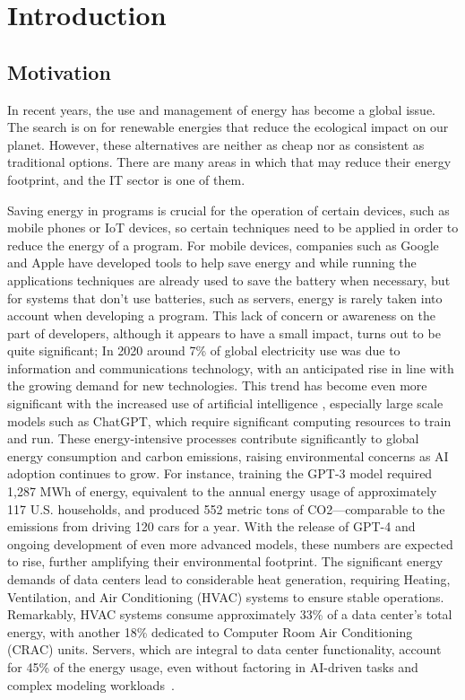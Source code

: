 \chapter{Introduction}

\section{Motivation}

In recent years, the use and management of energy has become a global issue. The search is on for renewable energies that reduce the ecological impact on our planet. However, these alternatives are neither as cheap nor as consistent as traditional options. There are many areas in which that may reduce their energy footprint, and the IT sector is one of them.

Saving energy in programs is crucial for the operation of certain devices, such as mobile phones or IoT devices, so certain techniques need to be applied in order to reduce the energy of a program. For mobile devices, companies such as Google and Apple have developed tools\cite{google_adaptive_battery,google_battery_saver,apple_clean_energy, android_power_profiler} to help save energy and while running the applications techniques are already used to save the battery when necessary, but for systems that don't use batteries, such as servers, energy is rarely taken into account when developing a program. This lack of concern or awareness on the part of developers, although it appears to have a small impact, turns out to be quite significant; In 2020 around 7\% of global electricity use was due to information and communications technology, with an anticipated rise in line with the growing demand for new technologies\cite{article}. This trend has become even more significant with the increased use of artificial intelligence \cite{patterson2021carbon}, especially large scale models such as ChatGPT, which require significant computing resources to train and run. These energy-intensive processes contribute significantly to global energy consumption and carbon emissions, raising environmental concerns as AI adoption continues to grow. For instance, training the GPT-3 model required 1,287 MWh of energy, equivalent to the annual energy usage of approximately 117 U.S. households, and produced 552 metric tons of CO2—comparable to the emissions from driving 120 cars for a year. With the release of GPT-4 and ongoing development of even more advanced models, these numbers are expected to rise, further amplifying their environmental footprint. The significant energy demands of data centers lead to considerable heat generation, requiring Heating, Ventilation, and Air Conditioning (HVAC) systems to ensure stable operations. Remarkably, HVAC systems consume approximately 33\% of a data center's total energy, with another 18\% dedicated to Computer Room Air Conditioning (CRAC) units. Servers, which are integral to data center functionality, account for 45\% of the energy usage, even without factoring in AI-driven tasks and complex modeling workloads~\cite{balaras2017high}.

